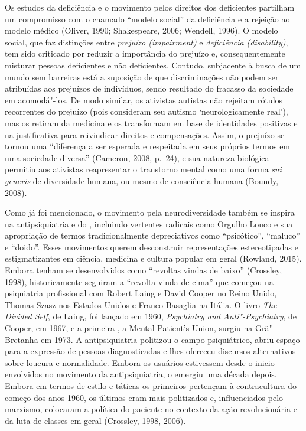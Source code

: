 Os estudos da deficiência e o movimento pelos direitos dos deficientes
partilham um compromisso com o chamado ``modelo social'' da deficiência
e a rejeição ao modelo médico (Oliver, 1990; Shakespeare, 2006; Wendell,
1996). O modelo social, que faz distinções entre \emph{prejuízo
(impairment)} e \emph{deficiência (disability)}, tem sido criticado por
reduzir a importância do prejuízo e, consequentemente misturar pessoas
deficientes e não deficientes. Contudo, subjacente à busca de um mundo
sem barreiras está a suposição de que discriminações não podem ser
atribuídas aos prejuízos de indivíduos, sendo resultado do fracasso da
sociedade em acomodá"-los. De modo similar, os ativistas autistas não
rejeitam rótulos recorrentes do prejuízo (pois consideram seu autismo
`neurologicamente real'), mas os retiram da medicina e os transformam em
base de identidades positivas e na justificativa para reivindicar
direitos e compensações. Assim, o prejuízo se tornou uma ``diferença a
ser esperada e respeitada em seus próprios termos em uma sociedade
diversa'' (Cameron, 2008, p.~24), e sua natureza biológica permitiu aos
ativistas reapresentar o transtorno mental como uma forma \emph{sui
generis} de diversidade humana, ou mesmo de consciência humana (Boundy,
2008).

Como já foi mencionado, o movimento pela neurodiversidade também se
inspira na antipsiquiatria e do , incluindo vertentes radicais como
Orgulho Louco e sua apropriação de termos tradicionalmente depreciativos
como ``psicótico'', ``maluco'' e ``doido''. Esses movimentos querem
desconstruir representações estereotipadas e estigmatizantes em ciência,
medicina e cultura popular em geral (Rowland, 2015). Embora tenham se
desenvolvidos como ``revoltas vindas de baixo'' (Crossley, 1998),
historicamente seguiram a ``revolta vinda de cima'' que começou na
psiquiatria profissional com Robert Laing e David Cooper no Reino Unido,
Thomas Szasz nos Estados Unidos e Franco Basaglia na Itália. O livro
\emph{The Divided Self}, de Laing, foi lançado em 1960, \emph{Psychiatry
and Anti"-Psychiatry}, de Cooper, em 1967, e a primeira , a Mental
Patient's Union, surgiu na Grã"-Bretanha em 1973. A antipsiquiatria
politizou o campo psiquiátrico, abriu espaço para a expressão de pessoas
diagnosticadas e lhes ofereceu discursos alternativos sobre loucura e
normalidade. Embora os usuários estivessem desde o inicio envolvidos no
movimento da antipsiquiatria, o  emergiu uma década depois. Embora
em termos de estilo e táticas os primeiros pertençam à contracultura do
começo dos anos 1960, os últimos eram mais politizados e, influenciados
pelo marxismo, colocaram a política do paciente no contexto da ação
revolucionária e da luta de classes em geral (Crossley, 1998, 2006).

